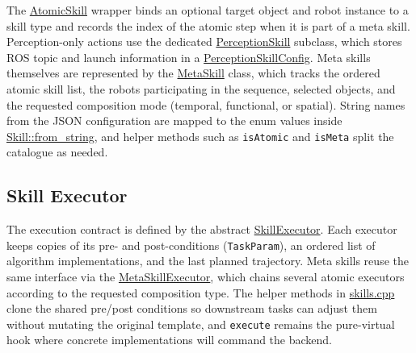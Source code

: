 \documentclass{article}
\begin{document}
The \href{https://github.com/intelligent-control-lab/AIDF/blob/main/skillgraph/api/skills.hpp#L58}{AtomicSkill} wrapper binds an optional target object and robot instance to a skill type and records the index of the atomic step when it is part of a meta skill. Perception-only actions use the dedicated \href{https://github.com/intelligent-control-lab/AIDF/blob/main/skillgraph/api/skills.hpp#L93}{PerceptionSkill} subclass, which stores ROS topic and launch information in a \href{https://github.com/intelligent-control-lab/AIDF/blob/main/skillgraph/api/skills.hpp#L86}{PerceptionSkillConfig}. Meta skills themselves are represented by the \href{https://github.com/intelligent-control-lab/AIDF/blob/main/skillgraph/api/skills.hpp#L118}{MetaSkill} class, which tracks the ordered atomic skill list, the robots participating in the sequence, selected objects, and the requested composition mode (temporal, functional, or spatial). String names from the JSON configuration are mapped to the enum values inside \href{https://github.com/intelligent-control-lab/AIDF/blob/main/skillgraph/src/skills.cpp#L5}{Skill::from_string}, and helper methods such as \texttt{isAtomic} and \texttt{isMeta} split the catalogue as needed.

\subsection{Skill Executor}\label{sec:skill-executor}
The execution contract is defined by the abstract \href{https://github.com/intelligent-control-lab/AIDF/blob/main/skillgraph/api/skills.hpp#L175}{SkillExecutor}. Each executor keeps copies of its pre- and post-conditions (\texttt{TaskParam}), an ordered list of algorithm implementations, and the last planned trajectory. Meta skills reuse the same interface via the \href{https://github.com/intelligent-control-lab/AIDF/blob/main/skillgraph/api/skills.hpp#L204}{MetaSkillExecutor}, which chains several atomic executors according to the requested composition type. The helper methods in \href{https://github.com/intelligent-control-lab/AIDF/blob/main/skillgraph/src/skills.cpp#L108}{skills.cpp} clone the shared pre/post conditions so downstream tasks can adjust them without mutating the original template, and \texttt{execute} remains the pure-virtual hook where concrete implementations will command the backend.
\end{document}
